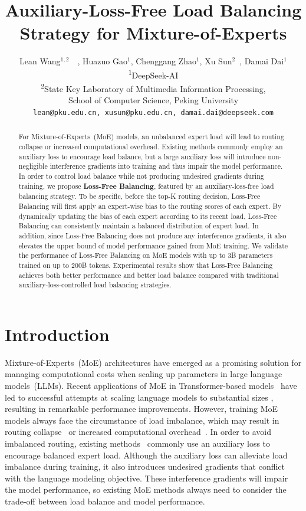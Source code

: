 \documentclass{article}
\title{Auxiliary-Loss-Free Load Balancing 
Strategy for Mixture-of-Experts}
\author{Lean Wang$^{1,2}$\thanksA{~Contribution during internship at DeepSeek-AI.}~~, Huazuo Gao$^{1}$, Chenggang Zhao$^{1}$, Xu Sun$^{2}$\footnotemark[2]~, Damai Dai$^{1}$\thanksB{~Corresponding author.}\\
\textsuperscript{1}{DeepSeek-AI}\\
\textsuperscript{2}{State Key Laboratory of Multimedia Information Processing,}\\ {School of Computer Science, Peking University}\\
\texttt{{lean@pku.edu.cn, xusun@pku.edu.cn, damai.dai@deepseek.com}}
}
\newcommand{\ours}{Loss-Free Balancing}
\begin{document}
\maketitle

\begin{abstract}

For Mixture-of-Experts~(MoE) models, an unbalanced expert load will lead to routing collapse or increased computational overhead. 
Existing methods commonly employ an auxiliary loss to encourage load balance, but a large auxiliary loss will introduce non-negligible interference gradients into training and thus impair the model performance. 
In order to control load balance while not producing undesired gradients during training, we propose \textbf{\ours{}}, featured by an auxiliary-loss-free load balancing strategy. 
To be specific, before the top-K routing decision, \ours{} will first apply an expert-wise bias to the routing scores of each expert.
By dynamically updating the bias of each expert according to its recent load, \ours{} can consistently maintain a balanced distribution of expert load.
In addition, since \ours{} does not produce any interference gradients, it also elevates the upper bound of model performance gained from MoE training.
We validate the performance of \ours{} on MoE models with up to 3B parameters trained on up to 200B tokens.
Experimental results show that \ours{} achieves both better performance and better load balance compared with traditional auxiliary-loss-controlled load balancing strategies. 

\end{abstract}

\section{Introduction}
Mixture-of-Experts~(MoE) architectures have emerged as a promising solution for managing computational costs when scaling up parameters in large language models~(LLMs). 
Recent applications of MoE in Transformer-based models~\citep{Vaswani2017AttentionIA} have led to successful attempts at scaling language models to substantial sizes \citep{Shao2024DeepSeekV2AS,DeepSeekAI2024DeepSeekCoderV2BT,Dai2024DeepSeekMoETU,Fedus2021SwitchTS,Lepikhin2020GShardSG}, resulting in remarkable performance improvements. 
However, training MoE models always face the circumstance of load imbalance, which may result in routing collapse~\citep{Shazeer2017OutrageouslyLN} or increased computational overhead~\citep{Fedus2021SwitchTS,Lepikhin2020GShardSG,Shazeer2017OutrageouslyLN}. 
In order to avoid imbalanced routing, existing methods~\citep{Fedus2021SwitchTS,Lepikhin2020GShardSG} commonly use an auxiliary loss to encourage balanced expert load.
Although the auxiliary loss can alleviate load imbalance during training, it also introduces undesired gradients that conflict with the language modeling objective. 
These interference gradients will impair the model performance, so existing MoE methods always need to consider the trade-off between load balance and model performance. 
\end{document}

